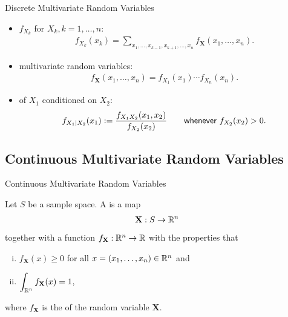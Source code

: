 \begin{frame}{Discrete Multivariate Random Variables}

\justifying
{} 
\begin{itemize}
	\item {} $f_{X_k}$ for $X_k, k = 1, \ldots, n$:
	\begin{align*}
	f_{X_k}(x_k) = \sum_{x_1, \ldots, x_{k-1}, x_{k+1}, \ldots, x_n} f_{\mathbf{X}}(x_1, \ldots, x_n).
	\end{align*}
	\item {} multivariate random variables:
	\begin{align*}
	f_{\mathbf{X}}(x_1, \ldots, x_n) = f_{X_1}(x_1)\cdots f_{X_n}(x_n).
	\end{align*}
	\item {} of $X_1$ conditioned on $X_2$:
	\begin{align*}
	f_{X_1|X_2}(x_1) := \frac{f_{X_1X_2}(x_1, x_2)}{f_{X_2}(x_2)} \qquad \mathsf{whenever\ } f_{X_2}(x_2) > 0.
	\end{align*}
\end{itemize}

\end{frame}


\subsection{Continuous Multivariate Random Variables}


\begin{frame}{Continuous Multivariate Random Variables}

\justifying
{} Let $S$ be a sample space. A  is a map
\begin{align*}
\mathbf{X}: S\rightarrow \mathbb{R}^n
\end{align*}
together with a function $f_{\mathbf{X}}: \mathbb{R}^n\rightarrow\mathbb{R}$ with the properties that
\begin{enumerate}[(i).]
	\item $f_{\mathbf{X}}(x) \geq 0$ for all $x = (x_1, \ldots, x_n)\in \mathbb{R}^n$ and
	\item $\displaystyle \int_{\mathbb{R}^n} f_{\mathbf{X}}(x) = 1$,
\end{enumerate}
where $f_{\mathbf{X}}$ is the  of the random variable $\mathbf{X}$.

\end{frame}

